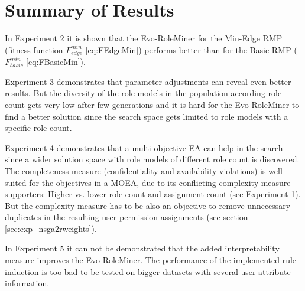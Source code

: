 \section{Summary of Results}
In Experiment 2 it is shown that the Evo-RoleMiner for the Min-Edge RMP (fitness function $F_{edge}^{min}$ \eqref{eq:FEdgeMin}) performs better than for the Basic RMP ($F_{basic}^{min}$ \eqref{eq:FBasicMin}).

Experiment 3 demonstrates that parameter adjustments can reveal even better results. But the diversity of the role models in the population according role count gets very low after few generations and it is hard for the Evo-RoleMiner to find a better solution since the search space gets limited to role models with a specific role count.

Experiment 4 demonstrates that a multi-objective EA can help in the search since a wider solution space with role models of different role count is discovered. The completeness measure (confidentiality and availability violations) is well suited for the objectives in a MOEA, due to its conflicting complexity measure supporters: Higher vs. lower role count and assignment count (see Experiment 1). But the complexity measure has to be also an objective to remove unnecessary duplicates in the resulting user-permission assignments (see section \ref{sec:exp_nsga2rweights}).

In Experiment 5 it can not be demonstrated that the added interpretability measure improves the Evo-RoleMiner. The performance of the implemented rule induction is too bad to be tested on bigger datasets with several user attribute information.
